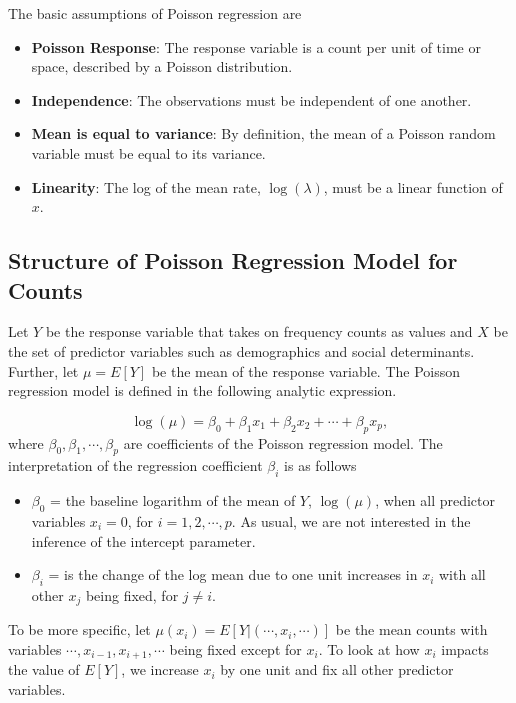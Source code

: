\documentclass[
]{book}
\begin{document}
The basic assumptions of Poisson regression are

\begin{itemize}
\item
  \textbf{Poisson Response}: The response variable is a count per unit of time or space, described by a Poisson distribution.
\item
  \textbf{Independence}: The observations must be independent of one another.
\item
  \textbf{Mean is equal to variance}: By definition, the mean of a Poisson random variable must be equal to its variance.
\item
  \textbf{Linearity}: The log of the mean rate, \(\log( \lambda)\), must be a linear function of \(x\).
\end{itemize}

\hypertarget{structure-of-poisson-regression-model-for-counts}{%
\subsection{Structure of Poisson Regression Model for Counts}\label{structure-of-poisson-regression-model-for-counts}}

Let \(Y\) be the response variable that takes on frequency counts as values and \(X\) be the set of predictor variables such as demographics and social determinants. Further, let \(\mu=E[Y]\) be the mean of the response variable. The Poisson regression model is defined in the following analytic expression.

\[
\log(\mu) = \beta_0 + \beta_1 x_1 + \beta_2 x_2 + \cdots + \beta_p x_p,
\] where \(\beta_0, \beta_1, \cdots, \beta_p\) are coefficients of the Poisson regression model. The interpretation of the regression coefficient \(\beta_i\) is as follows

\begin{itemize}
\item
  \(\beta_0\) = the baseline logarithm of the mean of \(Y\), \(\log(\mu)\), when all predictor variables \(x_i = 0\), for \(i = 1, 2, \cdots, p\). As usual, we are not interested in the inference of the intercept parameter.
\item
  \(\beta_i\) = is the change of the log mean due to one unit increases in \(x_i\) with all other \(x_j\) being fixed, for \(j\ne i\).
\end{itemize}

To be more specific, let \(\mu(x_i) = E[Y|(\cdots,x_i,\cdots)]\) be the mean counts with variables \(\cdots, x_{i-1}, x_{i+1}, \cdots\) being fixed except for \(x_i\). To look at how \(x_i\) impacts the value of \(E[Y]\), we increase \(x_i\) by one unit and fix all other predictor variables.
\end{document}
